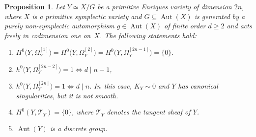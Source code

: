 \documentclass[10pt]{amsart}
\theoremstyle{plain}
\newtheorem{prop}[thm]{Proposition}
\theoremstyle{definition}
\DeclareMathOperator{\Aut}{Aut}
\begin{document}
\begin{prop}
\label{prop:basic_prop_PEV}
Let $Y \simeq X / G$ be a primitive Enriques variety of dimension $2n$, where $X$ is a primitive symplectic variety and $G \subseteq \Aut(X)$ is generated by a purely non-symplectic automorphism $g \in \Aut(X)$ of finite order $d \geq 2$ and acts freely in codimension one on~$X$. The following statements hold:
\begin{enumerate}
\item
\label{prop:basic_prop_PEVi}
$
H^0 \bigl(Y,\Omega_Y^{[1]} \bigr) = H^0 \bigl(Y,\Omega_Y^{[2]} \bigr) = H^0 \bigl(Y,\Omega_Y^{[2n - 1]} \bigr) = \{ 0 \}.
$
\smallskip
\item
\label{prop:basic_prop_PEVii}
$h^0 \bigl(Y, \Omega^{[2n-2]}_Y \bigr) = 1 \iff d \mid n-1$,

\item
\label{prop:basic_prop_PEViii}
$h^0 \bigl(Y, \Omega^{[2n]}_Y \bigr) = 1 \iff d \mid n$. In~this case, $K_Y \sim 0$ and $Y$ has canonical singularities, but it is not smooth.

\item\label{prop:basic_prop_PEViv}
$H^0(Y,\mathscr{T}_Y) = \{ 0 \}$, where $\mathscr{T}_Y$ denotes the tangent sheaf of $Y$.

\item\label{prop:basic_prop_PEVv}
$\Aut(Y)$ is a discrete group.
\end{enumerate}
\end{prop}
\end{document}
